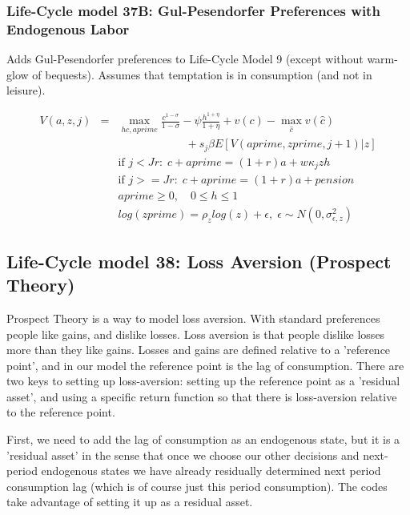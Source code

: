 \subsubsection{Life-Cycle model 37B: Gul-Pesendorfer Preferences with Endogenous Labor}
Adds Gul-Pesendorfer preferences to Life-Cycle Model 9 (except without warm-glow of bequests). Assumes that temptation is in consumption (and not in leisure).

\begin{eqnarray*}
 V(a,z,j)&=& \max_{hc,aprime} \frac{c^{1-\sigma}}{1-\sigma} - \psi \frac{h^{1+\eta}}{1+\eta} + v(c) -\max_{\hat{c}} v(\hat{c}) \\
 && \quad \quad \quad \quad \quad \quad   + s_j \beta E[V(aprime,zprime,j+1)|z]\\
&& \text{if }j<Jr: \; c+aprime=(1+r)a+w \kappa_j z h\\
&& \text{if }j>=Jr: \; c+aprime=(1+r)a +pension\\
&& aprime\geq 0, \quad 0\leq h \leq 1 \\
&& log(zprime)=\rho_z log(z) + \epsilon, \; \epsilon \sim N(0,\sigma_{\epsilon,z}^2)
\end{eqnarray*}


\subsection{Life-Cycle model 38: Loss Aversion (Prospect Theory)}
Prospect Theory is a way to model loss aversion. With standard preferences people like gains, and dislike losses. Loss aversion is that people dislike losses more than they like gains. Losses and gains are defined relative to a 'reference point', and in our model the reference point is the lag of consumption. There are two keys to setting up loss-aversion: setting up the reference point as a 'residual asset', and using a specific return function so that there is loss-aversion relative to the reference point.

First, we need to add the lag of consumption as an endogenous state, but it is a 'residual asset' in the sense that once we choose our other decisions and next-period endogenous states we have already residually determined next period consumption lag (which is of course just this period consumption). The codes take advantage of setting it up as a residual asset.

